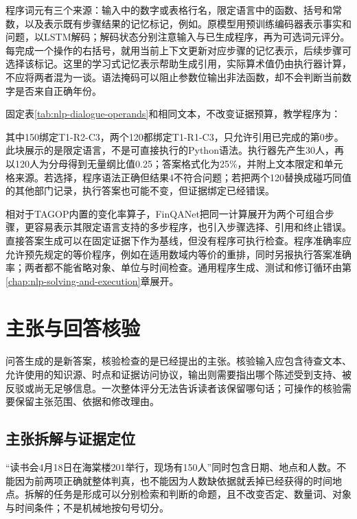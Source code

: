 程序词元有三个来源：输入中的数字或表格行名，限定语言中的函数、括号和常数，以及表示既有步骤结果的记忆标记，例如。原模型用预训练编码器表示事实和问题，以LSTM解码；解码状态分别注意输入与已生成程序，再为可选词元评分。每完成一个操作的右括号，就用当前上下文更新对应步骤的记忆表示，后续步骤可选择该标记。这里的学习式记忆表示帮助生成引用，实际算术值仍由执行器计算，不应将两者混为一谈。语法掩码可以阻止参数位输出非法函数，却不会判断当前数字是否来自正确年份。

固定表\ref{tab:nlp-dialogue-operands}和相同文本，不改变证据预算，教学程序为：
其中150绑定T1-R2-C3，两个120都绑定T1-R1-C3，只允许引用已完成的第0步。此块展示的是限定语言，不是可直接执行的Python语法。执行器先产生30人，再以120人为分母得到无量纲比值0.25；答案格式化为25\%，并附上文本限定和单元格来源。若选择，程序语法正确但结果4不符合问题；若把两个120替换成碰巧同值的其他部门记录，执行答案也可能不变，但证据绑定已经错误。

相对于TAGOP内置的变化率算子，FinQANet把同一计算展开为两个可组合步骤，更容易表示其限定语言支持的多步程序，也引入步骤选择、引用和终止错误。直接答案生成可以在固定证据下作为基线，但没有程序可执行检查。程序准确率应允许预先规定的等价程序，例如在适用数域内等价的重排，同时另报执行答案准确率；两者都不能省略对象、单位与时间检查。通用程序生成、测试和修订循环由第\ref{chap:nlp-solving-and-execution}章展开。

\section{主张与回答核验}
\label{sec:nlp-dialogue-verification}

问答生成的是新答案，核验检查的是已经提出的主张。核验输入应包含待查文本、允许使用的知识源、时点和证据访问协议，输出则需要指出哪个陈述受到支持、被反驳或尚无足够信息。一次整体评分无法告诉读者该保留哪句话；可操作的核验需要保留主张范围、依据和修改理由。

\subsection{主张拆解与证据定位}
\label{sec:nlp-dialogue-claims}

“读书会4月18日在海棠楼201举行，现场有150人”同时包含日期、地点和人数。不能因为前两项正确就整体判真，也不能因为人数缺依据就丢掉已经获得的时间地点。拆解的任务是形成可以分别检索和判断的命题，且不改变否定、数量词、对象与时间条件；不是机械地按句号切分。

